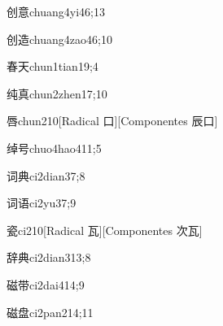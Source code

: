 \begin{verbete}{创意}{chuang4yi4}{6;13}
\end{verbete}

\begin{verbete}{创造}{chuang4zao4}{6;10}
\end{verbete}

\begin{verbete}{春天}{chun1tian1}{9;4}
\end{verbete}

\begin{verbete}{纯真}{chun2zhen1}{7;10}
\end{verbete}

\begin{verbete}{唇}{chun2}{10}[Radical ⼝][Componentes ⾠⼝]
\end{verbete}

\begin{verbete}{绰号}{chuo4hao4}{11;5}
\end{verbete}

\begin{verbete}{词典}{ci2dian3}{7;8}
\end{verbete}

\begin{verbete}{词语}{ci2yu3}{7;9}
\end{verbete}

\begin{verbete}{瓷}{ci2}{10}[Radical ⽡][Componentes 次⽡]
\end{verbete}

\begin{verbete}{辞典}{ci2dian3}{13;8}
\end{verbete}

\begin{verbete}{磁带}{ci2dai4}{14;9}
\end{verbete}

\begin{verbete}{磁盘}{ci2pan2}{14;11}
\end{verbete}

